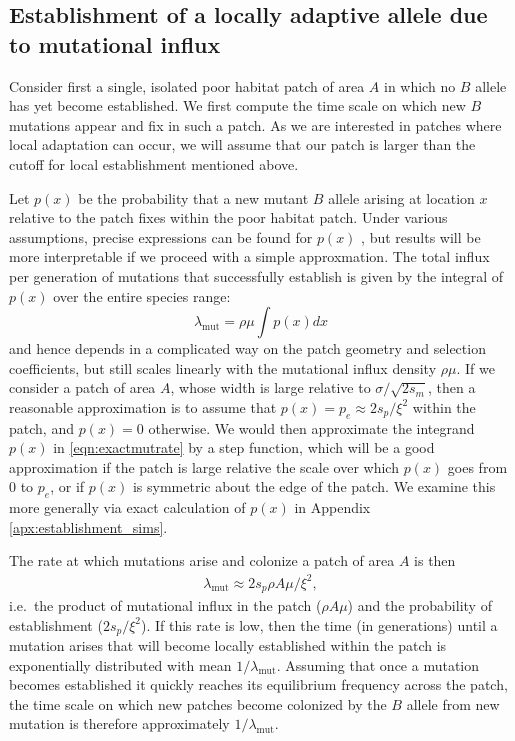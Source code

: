 \documentclass{article}
\newcommand{\mutrate}{\lambda_\text{mut}}
\begin{document}
\subsection{Establishment of a locally adaptive allele due to mutational influx}
\label{ss:patchymutation}

Consider first a single, isolated poor habitat patch of area $A$ in which no $B$ allele has yet become established. 
We first compute the time scale on which new $B$ mutations appear and fix in such a patch.
As we are interested in patches where local adaptation can occur,
we will assume that our patch is larger than the cutoff for local establishment 
mentioned above.

Let $p(x)$ be the probability that a new mutant $B$ allele arising at location $x$
relative to the patch fixes within the poor habitat patch.
Under various assumptions, precise expressions can be found for $p(x)$ \citep{barton1987establishment},
but results will be more interpretable if we proceed with a simple approxmation.
The total influx per generation of mutations that successfully establish is given by the
integral of $p(x)$ over the entire species range:
\begin{equation}
  \mutrate = \rho \mu \int p(x) dx \label{eqn:exactmutrate}
\end{equation}
and hence depends in a complicated way on the patch geometry and selection coefficients,
but still scales linearly with the mutational influx density $\rho \mu$.
If we consider a patch of area $A$, whose width is large relative to $\sigma/\sqrt{2s_m}$, 
then a reasonable approximation is to assume that $p(x) = p_e \approx 2 s_p / \xi^2$ within the patch, and $p(x) = 0$ otherwise.
We would then approximate the integrand $p(x)$ in \eqref{eqn:exactmutrate} by a step function,
which will be a good approximation if the patch is large relative the scale over which $p(x)$ goes from 0 to $p_e$,
or if $p(x)$ is symmetric about the edge of the patch.
We examine this more generally via exact calculation of $p(x)$ in Appendix \ref{apx:establishment_sims}.

The rate at which mutations arise and colonize a patch of area $A$ is then
\begin{align} \label{eqn:mutrate} 
  \mutrate %
  \approx 2 s_p \rho A \mu / \xi^2,  
\end{align}
i.e.\ the product of mutational influx in the patch ($\rho A\mu$) and the probability of establishment ($2s_p/\xi^2$).
If this rate is low, then the time (in generations) until a mutation arises that
will become locally established within the patch is exponentially distributed with mean $1/\mutrate$.  
Assuming that once a mutation becomes established it quickly reaches its equilibrium frequency across the patch, 
the time scale on which new patches become colonized by the $B$ allele from new mutation is therefore approximately $1/\mutrate$.
\end{document}
